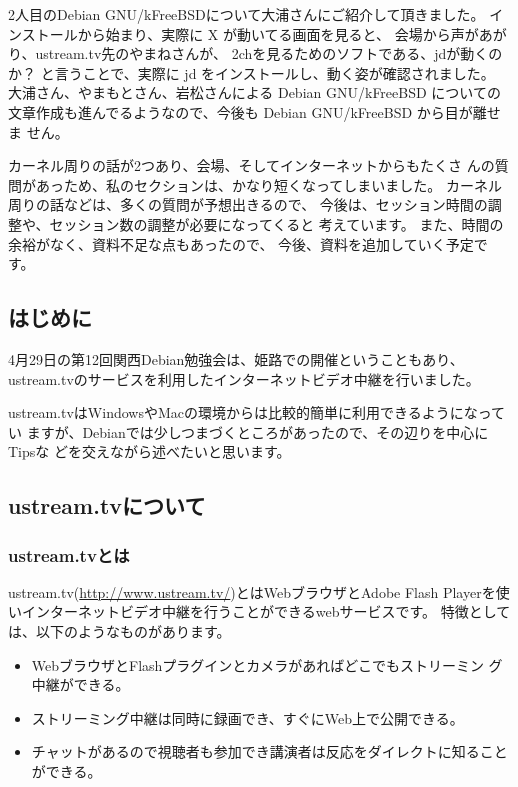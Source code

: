 \documentclass[mingoth,a4paper]{jsarticle}
\begin{document}
2人目のDebian GNU/kFreeBSDについて大浦さんにご紹介して頂きました。
インストールから始まり、実際に X が動いてる画面を見ると、
会場から声があがり、ustream.tv先のやまねさんが、
2chを見るためのソフトである、jdが動くのか？
と言うことで、実際に jd をインストールし、動く姿が確認されました。
大浦さん、やまもとさん、岩松さんによる Debian GNU/kFreeBSD についての
文章作成も進んでるようなので、今後も Debian GNU/kFreeBSD から目が離せま
せん。

カーネル周りの話が2つあり、会場、そしてインターネットからもたくさ
んの質問があっため、私のセクションは、かなり短くなってしまいました。
カーネル周りの話などは、多くの質問が予想出きるので、
今後は、セッション時間の調整や、セッション数の調整が必要になってくると
考えています。
また、時間の余裕がなく、資料不足な点もあったので、
今後、資料を追加していく予定です。


\subsection{はじめに}

4月29日の第12回関西Debian勉強会は、姫路での開催ということもあり、
ustream.tvのサービスを利用したインターネットビデオ中継を行いました。

ustream.tvはWindowsやMacの環境からは比較的簡単に利用できるようになってい
ますが、Debianでは少しつまづくところがあったので、その辺りを中心にTipsな
どを交えながら述べたいと思います。

\subsection{ustream.tvについて}

\subsubsection{ustream.tvとは}

ustream.tv(\url{http://www.ustream.tv/})とはWebブラウザとAdobe Flash
Playerを使いインターネットビデオ中継を行うことができるwebサービスです。
特徴としては、以下のようなものがあります。

\begin{itemize}
 \item WebブラウザとFlashプラグインとカメラがあればどこでもストリーミン
       グ中継ができる。
 \item ストリーミング中継は同時に録画でき、すぐにWeb上で公開できる。
 \item チャットがあるので視聴者も参加でき講演者は反応をダイレクトに知ることができる。
\end{itemize}
\end{document}
